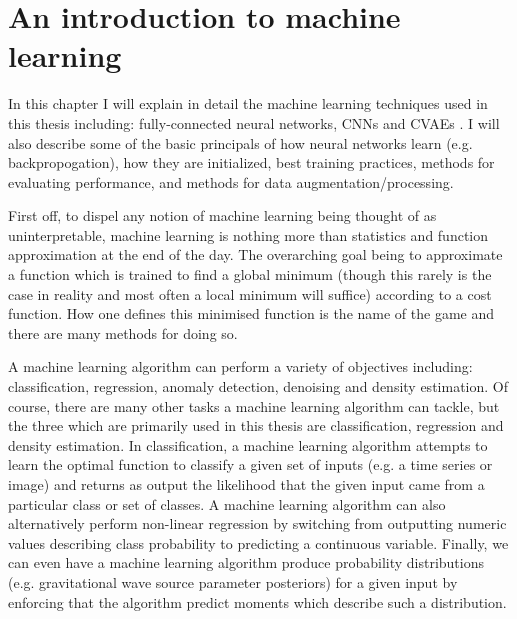 \chapter{An introduction to machine learning}

%
%
In this chapter I will explain in detail the machine learning techniques used in this thesis including: 
fully-connected neural networks\cite{Goodfellow-et-al-2016}, \ac{CNN}s \cite{NIPS2012_4824} 
and \ac{CVAE}s \cite{1812.04405}. I will also 
describe some of the basic principals of how neural networks 
learn (e.g. backpropogation\cite{LeCun1998f}), how they are initialized, 
best training practices, methods for evaluating performance, 
and methods for data augmentation/processing.

First off, to dispel any notion of machine learning being 
thought of as uninterpretable, machine learning is nothing more 
than statistics and function approximation at the end of 
the day. The overarching goal being to approximate a 
function which is trained to find a global minimum 
(though this rarely is the case in reality and most 
often a local minimum will suffice) according to a cost function. How one defines 
this minimised function is the name of the game and there 
are many methods for doing so. 

A machine learning algorithm can perform a variety of objectives 
including: classification\cite{1404.7584}, regression\cite{6909637}, anomaly 
detection\cite{9243329}, denoising \cite{1912.13171} and density estimation\cite{1910.13233}. Of course, 
there are many other tasks a machine learning algorithm 
can tackle, but the three which are primarily used in this 
thesis are classification, regression and density estimation.
In classification, a machine learning algorithm attempts 
to learn the optimal function to classify a given set 
of inputs (e.g. a time series or image) and returns as 
output the likelihood that the given input came from a 
particular class or set of 
classes. A machine learning algorithm can also alternatively perform 
non-linear regression by switching from outputting numeric 
values describing class probability to  
predicting a continuous variable. Finally, we can even have a machine learning 
algorithm produce probability distributions (e.g. gravitational wave source parameter posteriors) for a given input by 
enforcing that the algorithm predict moments which describe %
such a distribution. 

